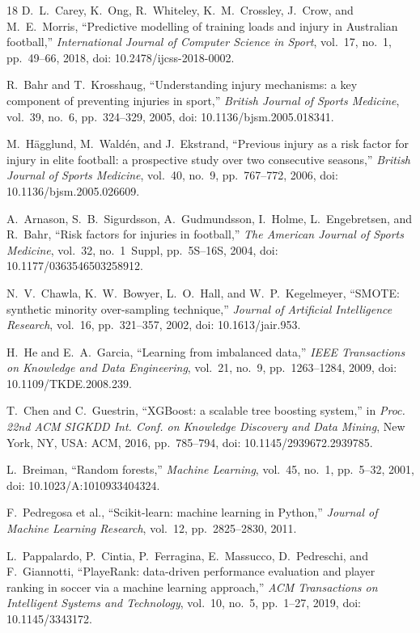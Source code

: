 \documentclass[conference]{IEEEtran}
\begin{document}
\begin{thebibliography}{18}
D.~L.~Carey, K.~Ong, R.~Whiteley, K.~M.~Crossley, J.~Crow, and M.~E.~Morris, ``Predictive modelling of training loads and injury in Australian football,'' \emph{International Journal of Computer Science in Sport}, vol.~17, no.~1, pp.~49--66, 2018, doi: 10.2478/ijcss-2018-0002.

R.~Bahr and T.~Krosshaug, ``Understanding injury mechanisms: a key component of preventing injuries in sport,'' \emph{British Journal of Sports Medicine}, vol.~39, no.~6, pp.~324--329, 2005, doi: 10.1136/bjsm.2005.018341.

M.~H\"{a}gglund, M.~Wald\'{e}n, and J.~Ekstrand, ``Previous injury as a risk factor for injury in elite football: a prospective study over two consecutive seasons,'' \emph{British Journal of Sports Medicine}, vol.~40, no.~9, pp.~767--772, 2006, doi: 10.1136/bjsm.2005.026609.

A.~Arnason, S.~B.~Sigurdsson, A.~Gudmundsson, I.~Holme, L.~Engebretsen, and R.~Bahr, ``Risk factors for injuries in football,'' \emph{The American Journal of Sports Medicine}, vol.~32, no.~1~Suppl, pp.~5S--16S, 2004, doi: 10.1177/0363546503258912.

N.~V.~Chawla, K.~W.~Bowyer, L.~O.~Hall, and W.~P.~Kegelmeyer, ``SMOTE: synthetic minority over-sampling technique,'' \emph{Journal of Artificial Intelligence Research}, vol.~16, pp.~321--357, 2002, doi: 10.1613/jair.953.

H.~He and E.~A.~Garcia, ``Learning from imbalanced data,'' \emph{IEEE Transactions on Knowledge and Data Engineering}, vol.~21, no.~9, pp.~1263--1284, 2009, doi: 10.1109/TKDE.2008.239.

T.~Chen and C.~Guestrin, ``XGBoost: a scalable tree boosting system,'' in \emph{Proc. 22nd ACM SIGKDD Int. Conf. on Knowledge Discovery and Data Mining}, New York, NY, USA: ACM, 2016, pp.~785--794, doi: 10.1145/2939672.2939785.

L.~Breiman, ``Random forests,'' \emph{Machine Learning}, vol.~45, no.~1, pp.~5--32, 2001, doi: 10.1023/A:1010933404324.

F.~Pedregosa et al., ``Scikit-learn: machine learning in Python,'' \emph{Journal of Machine Learning Research}, vol.~12, pp.~2825--2830, 2011.

L.~Pappalardo, P.~Cintia, P.~Ferragina, E.~Massucco, D.~Pedreschi, and F.~Giannotti, ``PlayeRank: data-driven performance evaluation and player ranking in soccer via a machine learning approach,'' \emph{ACM Transactions on Intelligent Systems and Technology}, vol.~10, no.~5, pp.~1--27, 2019, doi: 10.1145/3343172.

\end{thebibliography}
\end{document}
